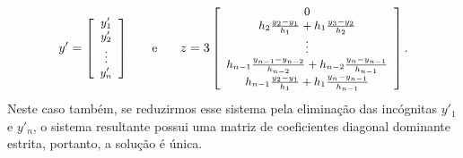 \begin{equation}
	\begin{small}
			y'= \left[\begin{array}{c}
				y'_1\\
				y'_2\\
				\vdots\\
				y'_n
		\end{array}\right]\qquad \text{e}\qquad
		z = 3\left[\begin{array}{c}
				0\\
				h_2\frac{y_2-y_1}{h_1}+h_1\frac{y_3-y_2}{h_2}\\
				\vdots\\
				h_{n-1}\frac{y_{n-1}-y_{n-2}}{h_{n-2}}+h_{n-2}\frac{y_n-y_{n-1}}{h_{n-1}}\\
				h_{n-1}\frac{y_2-y_1}{h_1}+h_1\frac{y_n-y_{n-1}}{h_{n-1}}\\
			\end{array}\right].
	\end{small}
\end{equation}
Neste caso também, se reduzirmos esse sistema pela eliminação das incógnitas $y'_1$ e $y'_n$, o sistema resultante possui uma matriz de coeficientes diagonal dominante estrita, portanto, a solução é única.



